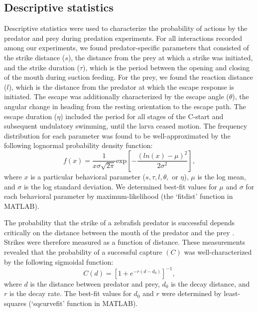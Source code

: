 \documentclass[]{rsos}%
\begin{document}
\subsection{Descriptive statistics}

Descriptive statistics were used to characterize the probability of actions by the predator and prey during predation experiments.
For all interactions recorded among our experiments, we found predator-specific parameters that consisted of the strike distance ($s$), the distance from the prey at which a strike was initiated, and the strike duration ($\tau$), which is the period between the opening and closing of the mouth during suction feeding. 
For the prey, we found the reaction distance ($l$), which is the distance from the predator at which the escape response is initiated.
The escape was additionally characterized by the escape angle ($\theta$), the angular change in heading from the resting orientation to the escape path.
The escape duration ($\eta$) included the period for all stages of the C-start and subsequent undulatory swimming, until the larva ceased motion.
The frequency distribution for each parameter was found to be well-approximated by the following lognormal probability density function:
%
\begin{equation}%
f(x) = \frac{1}{x\sigma \sqrt{2 \pi}} \text{exp} \left[ -{\frac{(ln(x)-\mu)^2}{2\sigma ^2}} \right],
\label{eqn_lognorm}
\end{equation}
%
where $x$ is a particular behavioral parameter ($s, \tau, l, \theta ,$ or $\eta$), $\mu$ is the log mean, and $\sigma$ is the log standard deviation. 
We determined best-fit values for $\mu$ and $\sigma$ for each behavioral parameter by maximum-likelihood (the `fitdist' function in MATLAB).

The probability that the strike of a zebrafish predator is successful depends critically on the distance between the mouth of the predator and the prey \cite{Stewart:2013bha}.
Strikes were therefore measured as a function of distance. 
These measurements revealed that the probability of a successful capture $(C)$ was well-characterized by the following sigmoidal function:
%
\begin{equation}%
C(d) = \left[ 1+e^{-r(d-d_0)} \right]^{-1},
\label{eqn_sig} 
\end{equation}
%
where $d$ is the distance between predator and prey, $d_0$ is the decay distance, and $r$ is the decay rate. 
The best-fit values for $d_0$ and $r$ were determined by least-squares (`sqcurvefit' function in MATLAB).
\end{document}
